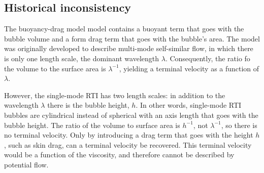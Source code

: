 \subsection{Historical inconsistency}

The buoyancy-drag model model contains a buoyant term that goes with the bubble volume and a form drag term that goes with the bubble's area.
The model was originally developed to describe multi-mode self-similar flow, in which there is only one length scale, the dominant wavelength $\lambda$.
Consequently, the ratio fo the volume to the surface area is $\lambda^{-1}$, yielding a terminal velocity as a function of $\lambda$.

However, the single-mode RTI has two length scales: in addition to the wavelength $\lambda$ there is the bubble height, $h$.
In other words, single-mode RTI bubbles are cylindrical instead of spherical with an axis length that goes with the bubble height.
The ratio of the volume to surface area is $h^{-1}$, not $\lambda^{-1}$, so there is no terminal velocity.
Only by introducing a drag term that goes with the height $h$, such as skin drag, can a terminal velocity be recovered.
This terminal velocity would be a function of the viscosity, and therefore cannot be described by potential flow.

